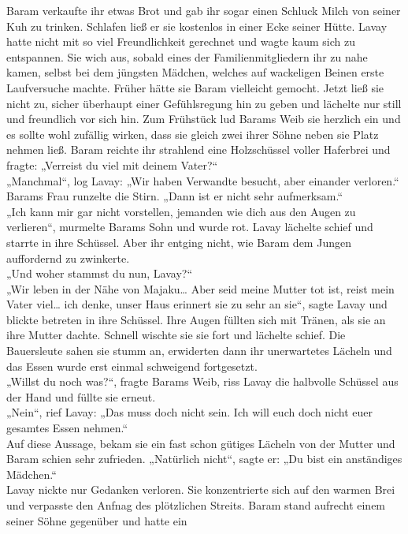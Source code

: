 Baram verkaufte ihr etwas Brot und gab ihr sogar einen Schluck Milch von seiner Kuh zu trinken. 
Schlafen ließ er sie kostenlos in einer Ecke seiner Hütte. Lavay hatte nicht mit so viel 
Freundlichkeit gerechnet und wagte kaum sich zu entspannen. Sie wich aus, sobald eines der 
Familienmitgliedern ihr zu nahe kamen, selbst bei dem jüngsten Mädchen, welches auf wackeligen 
Beinen erste Laufversuche machte. Früher hätte sie Baram vielleicht gemocht. Jetzt ließ sie nicht 
zu, sicher überhaupt einer Gefühlsregung hin zu geben und lächelte nur still und freundlich vor 
sich hin. 
Zum Frühstück lud Barams Weib sie herzlich ein und es sollte wohl zufällig wirken, dass sie gleich 
zwei ihrer Söhne neben sie Platz nehmen ließ. Baram reichte ihr strahlend eine Holzschüssel voller 
Haferbrei und fragte: „Verreist du viel mit deinem Vater?“\\
„Manchmal“, log Lavay: „Wir haben Verwandte besucht, aber einander verloren.“\\
Barams Frau runzelte die Stirn. „Dann ist er nicht sehr aufmerksam.“\\
„Ich kann mir gar nicht vorstellen, jemanden wie dich aus den Augen zu verlieren“, murmelte Barams 
Sohn und wurde rot. Lavay lächelte schief und starrte in ihre Schüssel. Aber ihr entging nicht, wie 
Baram dem Jungen auffordernd zu zwinkerte.\\
„Und woher stammst du nun, Lavay?“\\
„Wir leben in der Nähe von Majaku… Aber seid meine Mutter tot ist, reist mein Vater viel… ich denke, 
unser Haus erinnert sie zu sehr an sie“, sagte Lavay und blickte betreten in ihre Schüssel. Ihre 
Augen füllten sich mit Tränen, als sie an ihre Mutter dachte. Schnell wischte sie sie fort und 
lächelte schief. Die Bauersleute sahen sie stumm an, erwiderten dann ihr unerwartetes Lächeln und 
das Essen wurde erst einmal schweigend fortgesetzt.\\
„Willst du noch was?“, fragte Barams Weib, riss Lavay die halbvolle Schüssel aus der Hand und füllte 
sie erneut.\\
 „Nein“, rief Lavay: „Das muss doch nicht sein. Ich will euch doch nicht euer gesamtes Essen 
nehmen.“\\
Auf diese Aussage, bekam sie ein fast schon gütiges Lächeln von der Mutter und Baram schien sehr 
zufrieden. „Natürlich nicht“, sagte er: „Du bist ein anständiges Mädchen.“\\
Lavay nickte nur Gedanken verloren. Sie konzentrierte sich auf den warmen Brei und verpasste den 
Anfnag des plötzlichen Streits. Baram stand aufrecht einem seiner Söhne gegenüber und hatte ein 

